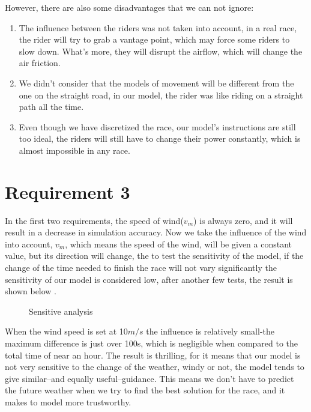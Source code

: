 \documentclass[12pt]{article}
\begin{document}
However, there are also some disadvantages that we can not ignore:
\begin{enumerate}
    \item The influence between the riders was not taken into account, in a real race, the rider will try to grab a vantage point, which may force some riders to
          slow down. What's more, they will disrupt the airflow, which will change the air friction.%
    \item We didn't consider that the models of movement will be different from the one on the straight road, in our model, the rider was like riding on a straight path
          all the time.%
    \item Even though we have discretized the race, our model’s instructions are still too ideal, the riders will still have to change their power constantly, which is
          almost impossible in any race. %
\end{enumerate}
\section{Requirement 3}
In the first two requirements, the speed of wind($v_m$) is always zero, and it will result in a decrease in simulation accuracy.
Now we take the influence of the wind into account,  $v_m$, which means the speed of the wind, will be given a constant value, but its direction will change, the
to test the sensitivity of the model, if the change of the time needed to finish the race will not vary significantly the sensitivity of our model
is considered low, after another few tests, the result is shown below
.
\begin{figure}
    \centering
    
    \caption{Sensitive analysis}
\end{figure}
When the wind speed is set at 10$m/s$ the influence is relatively small-the maximum difference is just over 100s, which is negligible when compared to the total time of
near an hour. The result is thrilling, for it means that our model is not very sensitive to the change of the weather, windy or not, the model tends to give similar--and
equally useful--guidance. This means we don't have to predict the future weather when we try to find the best solution for the race, and it makes to model more trustworthy.
\end{document}
